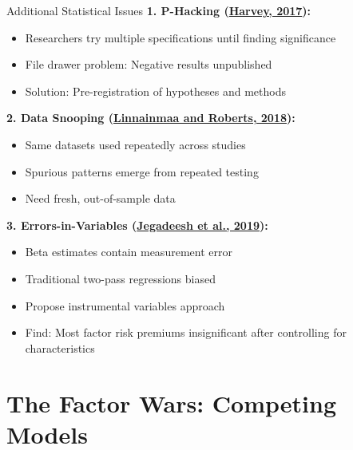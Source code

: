 \documentclass{beamer}
\begin{document}
\begin{frame}{Additional Statistical Issues}
    \textbf{1. P-Hacking (\textcolor{blue}{\href{https://doi.org/10.1111/jofi.12530}{Harvey, 2017}}):}
    \begin{itemize}
        \item Researchers try multiple specifications until finding significance
        \item File drawer problem: Negative results unpublished
        \item Solution: Pre-registration of hypotheses and methods
    \end{itemize}
    
    
    \textbf{2. Data Snooping (\textcolor{blue}{\href{https://academic.oup.com/rfs/article/31/7/2606/4977829}{Linnainmaa and Roberts, 2018}}):}
    \begin{itemize}
        \item Same datasets used repeatedly across studies
        \item Spurious patterns emerge from repeated testing
        \item Need fresh, out-of-sample data
    \end{itemize}
    
    
    \textbf{3. Errors-in-Variables (\textcolor{blue}{\href{https://doi.org/10.1016/j.jfineco.2019.02.010}{Jegadeesh et al., 2019}}):}
    \begin{itemize}
        \item Beta estimates contain measurement error
        \item Traditional two-pass regressions biased
        \item Propose instrumental variables approach
        \item Find: Most factor risk premiums insignificant after controlling for characteristics
    \end{itemize}
\end{frame}

\section{The Factor Wars: Competing Models}
\end{document}
